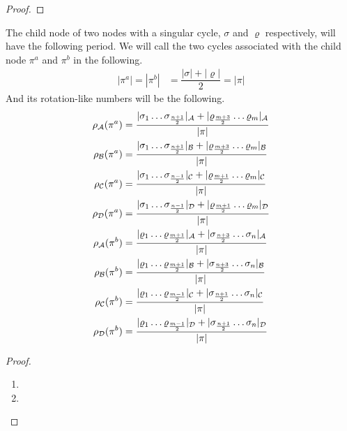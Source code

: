 \begin{proof}
\end{proof}

\begin{theorem}
    The child node of two nodes with a singular cycle, $\sigma$ and $\varrho$ respectively, will have the following period.
    We will call the two cycles associated with the child node $\pi^a$ and $\pi^b$ in the following.
    \begin{align*}
        |\pi^a| = |\pi^b| & = \dfrac{|\sigma| + |\varrho|}{2} = |\pi|
    \end{align*}
    And its rotation-like numbers will be the following.
    \begin{align*}
        \rho_{\mathcal{A}}(\pi^a) & = \dfrac{|\sigma_1 \dots \sigma_{\frac{n+1}{2}}|_{\mathcal{A}} + |\varrho_{\frac{m+3}{2}} \dots \varrho_m|_{\mathcal{A}}}{|\pi|} \\
        \rho_{\mathcal{B}}(\pi^a) & = \dfrac{|\sigma_1 \dots \sigma_{\frac{n+1}{2}}|_{\mathcal{B}} + |\varrho_{\frac{m+3}{2}} \dots \varrho_m|_{\mathcal{B}}}{|\pi|} \\
        \rho_{\mathcal{C}}(\pi^a) & = \dfrac{|\sigma_1 \dots \sigma_{\frac{n-1}{2}}|_{\mathcal{C}} + |\varrho_{\frac{m+1}{2}} \dots \varrho_m|_{\mathcal{C}}}{|\pi|} \\
        \rho_{\mathcal{D}}(\pi^a) & = \dfrac{|\sigma_1 \dots \sigma_{\frac{n-1}{2}}|_{\mathcal{D}} + |\varrho_{\frac{m+1}{2}} \dots \varrho_m|_{\mathcal{D}}}{|\pi|} \\
        \rho_{\mathcal{A}}(\pi^b) & = \dfrac{|\varrho_1 \dots \varrho_{\frac{m+1}{2}}|_{\mathcal{A}} + |\sigma_{\frac{n+3}{2}} \dots \sigma_n|_{\mathcal{A}}}{|\pi|} \\
        \rho_{\mathcal{B}}(\pi^b) & = \dfrac{|\varrho_1 \dots \varrho_{\frac{m+1}{2}}|_{\mathcal{B}} + |\sigma_{\frac{n+3}{2}} \dots \sigma_n|_{\mathcal{B}}}{|\pi|} \\
        \rho_{\mathcal{C}}(\pi^b) & = \dfrac{|\varrho_1 \dots \varrho_{\frac{m-1}{2}}|_{\mathcal{C}} + |\sigma_{\frac{n+1}{2}} \dots \sigma_n|_{\mathcal{C}}}{|\pi|} \\
        \rho_{\mathcal{D}}(\pi^b) & = \dfrac{|\varrho_1 \dots \varrho_{\frac{m-1}{2}}|_{\mathcal{D}} + |\sigma_{\frac{n+1}{2}} \dots \sigma_n|_{\mathcal{D}}}{|\pi|}
    \end{align*}
\end{theorem}

\begin{proof} \phantom{x}
    \begin{enumerate}
        \item {}
        \item {}
    \end{enumerate}
\end{proof}

